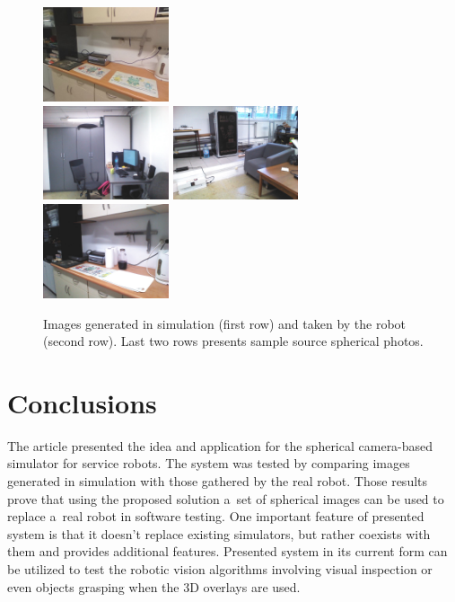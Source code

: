 \documentclass[conference]{ieeetran}
\begin{document}
\begin{figure}[!p]
    \includegraphics[width=0.33\textwidth]{img/sim_vs_tiago/sim_kuchnia_blat.jpg}\\\vspace{1mm}
    \includegraphics[width=0.33\textwidth]{img/sim_vs_tiago/tia_biurko.jpg}\hfill%
    \includegraphics[width=0.33\textwidth]{img/sim_vs_tiago/tia_fotel.jpg}\hfill%
    \includegraphics[width=0.33\textwidth]{img/sim_vs_tiago/tia_kuchnia_blat.jpg}\\
    \caption{Images generated in simulation (first row) and taken by the robot (second row). Last two rows presents
    sample source spherical photos.}
    \label{fig:sim_vs_tiago}
\end{figure}

\section{Conclusions}

The article presented the idea and application for the spherical camera-based 
simulator for service robots. The system was tested by comparing images generated in simulation
with those gathered by the real robot. Those results prove that using the proposed solution a~set 
of spherical images can be used to replace a~real robot in software testing.
One important feature of presented system is that it doesn't replace existing simulators,
but rather coexists with them and provides additional features.
Presented system in its current form can be utilized to test the robotic vision algorithms
involving visual inspection \cite{mmar_winiarski_automated-2016} or even objects
grasping \cite{seredynski2016fast} when the 3D overlays are used. 
\end{document}
